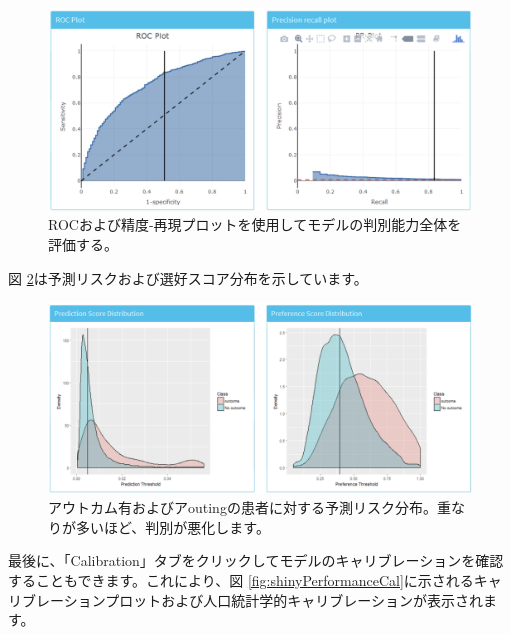 \documentclass[
  11pt]{book}
\theoremstyle{definition}
\theoremstyle{definition}
\theoremstyle{definition}
\theoremstyle{definition}
\theoremstyle{remark}
\begin{document}
\begin{figure}

{\centering \includegraphics[width=1\linewidth]{images/PatientLevelPrediction/shiny/shinyPerformanceDisc} 

}

\caption{ROCおよび精度-再現プロットを使用してモデルの判別能力全体を評価する。}\label{fig:shinyPerformanceDisc}
\end{figure}

図 \ref{fig:shinyPerformanceDist}は予測リスクおよび選好スコア分布を示しています。

\begin{figure}

{\centering \includegraphics[width=1\linewidth]{images/PatientLevelPrediction/shiny/shinyPerformanceDist} 

}

\caption{アウトカム有およびアoutingの患者に対する予測リスク分布。重なりが多いほど、判別が悪化します。}\label{fig:shinyPerformanceDist}
\end{figure}

最後に、「Calibration」タブをクリックしてモデルのキャリブレーションを確認することもできます。これにより、図 \ref{fig:shinyPerformanceCal}に示されるキャリブレーションプロットおよび人口統計学的キャリブレーションが表示されます。
\end{document}

